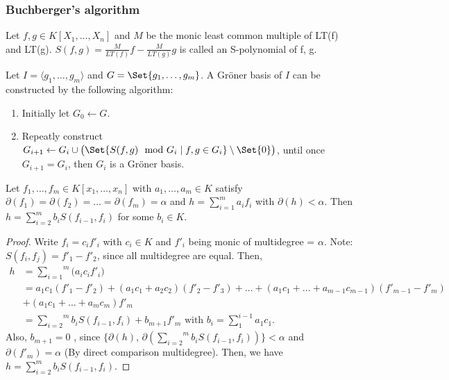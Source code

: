 \subsubsection{Buchberger's algorithm}

\begin{definition}
  Let $f,g \in K[X_1,\dots,X_n]$ and $M$ be the monic least common multiple of LT(f) and LT(g). $S(f,g) = \frac{M}{LT(f)}f- \frac{M}{LT(g)}g$ is called an S-polynomial of f, g.
\end{definition}

Let $I = \langle g_1, \dots, g_m \rangle$ and $G = \Set{ g_1, \dots, g_m }$.
A Gr\"{o}ner basis of $I$ can be constructed by the following algorithm:
\begin{enumerate}
  \item Initially let $G_0 \gets G$.
  \item Repeatly construct $G_{i+1} \gets G_i \cup \big( \Set{S(f, g) \mod G_i \mid f, g \in G_i} \setminus \Set{0} \big)$,
    until once $G_{i+1} = G_i$, then $G_i$ is a Gr\"{o}ner basis.
\end{enumerate}

\begin{lemma} \label{lemma:sum-of-equal-degree-f-is-less}
  Let $f_1, \dots, f_m \in K[x_1, \dots, x_n]$ with $a_1, \dots, a_m \in K$ satisfy
  $\partial(f_1) = \partial(f_2) = \dots = \partial(f_m) = \alpha$ and $h =\sum_{i = 1}^m a_i f_i $ with $\partial(h) < \alpha$.
  Then $h = \sum_{i = 2}^m b_i S(f_{i-1}, f_i)$ for some $b_i \in K$.
  \begin{proof}
    Write $f_i = c_if'_i$ with $c_i \in K$ and $f'_i$ being monic of multidegree = $\alpha$. Note: $S(f_i, f_j) = f'_1 - f'_2$, since all multidegree are equal. Then, 
    \begin{equation}
      \begin{split}
        h &= \overset{m}{\underset{i = 1}{\sum}} \big( a_ic_if'_i \big) \\
        &= a_1c_1(f'_1-f'_2) + (a_1c_1+a_2c_2)(f'_2-f'_3) + \dots+ (a_1c_1 + \dots + a_{m-1}c_{m-1})(f'_{m-1}-f'_m) \\
        &+ (a_1c_1+\dots+a_mc_m)f'_m \\
        &= \overset{m}{\underset{i = 2}{\sum}}b_iS(f_{i-1},f_i) + b_{m+1}f'_m\text{ with }b_i = \sum_{1}^{i-1}a_1c_1.
      \end{split}
    \end{equation}
      Also, $b_{m+1} = 0$ , since $\Big\{\partial(h)$, $\partial(\overset{m}{\underset{i = 2}{\sum}}b_iS(f_{i-1},f_i) ) \Big\} < \alpha$ and $\partial(f'_m) = \alpha$ (By direct comparison multidegree). Then, we have $h = \sum_{i = 2}^m b_i S(f_{i-1}, f_i)$.
  \end{proof}
\end{lemma}


